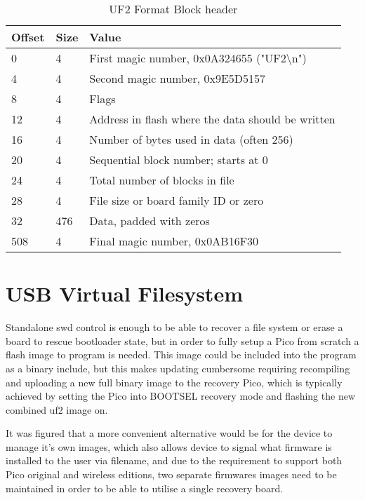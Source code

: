 {\begin{table}[h]
	\centering
	\caption{UF2 Format Block header\cite{USBFlashingFormat2023}}%
	\vspace{-16.5pt}%
	
	\begin{tabular}{|l|l|l|}
		\hline
		Offset	& Size &	Value\\ \hline
		0	& 4 &	First magic number, 0x0A324655 ("UF2\textbackslash n")\\ \hline
		4&	4&	Second magic number, 0x9E5D5157\\ \hline
		8	&4&	Flags\\ \hline
		12&	4	&Address in flash where the data should be written\\ \hline
		16&	4	&Number of bytes used in data (often 256)\\ \hline
		20&	4	&Sequential block number; starts at 0\\ \hline
		24&	4	&Total number of blocks in file\\ \hline
		28&	4	&File size or board family ID or zero\\ \hline
		32&	476&	Data, padded with zeros\\ \hline
		508&	4&	Final magic number, 0x0AB16F30\\ \hline

	\end{tabular}
	\label{table:uf2header}
\end{table}

\clearpage
\section{USB Virtual Filesystem}
Standalone \gls{swd} control is enough to be able to recover a file system or erase a board to rescue bootloader state, but in order to fully setup a Pico from scratch a flash image to program is needed. This image could be included into the program as a binary include, but this makes updating cumbersome requiring recompiling and uploading a new full binary image to the recovery Pico, which is typically achieved by setting the Pico into BOOTSEL recovery mode and flashing the new combined \gls{uf2} image on.

It was figured that a more convenient alternative would be for the device to manage it's own images, which also allows device to signal what firmware is installed to the user via filename, and due to the requirement to support both Pico original and wireless editions, two separate firmwares  images need to be maintained in order to be able to utilise a single recovery board.

}
